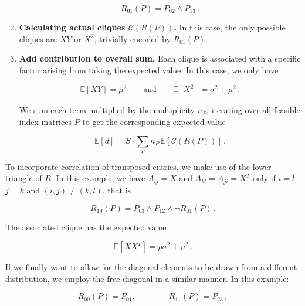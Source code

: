 \documentclass[10pt]{article}
\begin{document}
\begin{enumerate}
        \begin{equation}
            R_{01}(P) = P_{02} \land P_{13} \,.
        \end{equation}
                
    \item\textbf{Calculating actual cliques $\mathcal{C}(R(P))$.}
        In this case, the only possible cliques are $XY$ or $X^2$, trivially encoded by $R_{01}(P)$. 

    \item\textbf{Add contribution to overall sum.}
        Each clique is associated with a specific factor arising from taking the expected value. 
        In this case, we only have  

        \begin{equation}
            \mathbb{E}[XY] = \mu^2  \qquad \text{and} \qquad \mathbb{E}[X^2] = \sigma^2 + \mu^2 \,.  
        \end{equation}

        We sum each term multiplied by the multiplicity $n_P$, iterating over all feasible index matrices $P$
        to get the corresponding expected value

        \begin{equation}
            \mathbb{E}[d] = S \cdot \sum_P n_P \, \mathbb{E}[\mathcal{C}(R(P))] \,.
        \end{equation}

\end{enumerate}

To incorporate correlation of transposed entries, we make use of the lower triangle of $R$. 
In this example, we have $A_{ij} = X$ and $A_{kl} = A_{ji} = X^T$ only if $i = l$, $j = k$ 
and $(i, j) \ne (k, l)$, that is

\begin{equation}
    R_{10}(P) = P_{03} \land P_{12} \land \lnot R_{01}(P) \,.
\end{equation}
 
The associated clique has the expected value

\begin{equation}
    \mathbb{E}[X X^T] = \rho \sigma^2 + \mu^2 \,.
\end{equation}

If we finally want to allow for the diagonal elements to be drawn from a different distribution, 
we employ the free diagonal in a similar manner. In this example:

\begin{equation}
    R_{00}(P) = P_{01}, \qquad \qquad R_{11}(P) = P_{23} \,,  
\end{equation}
\end{document}
